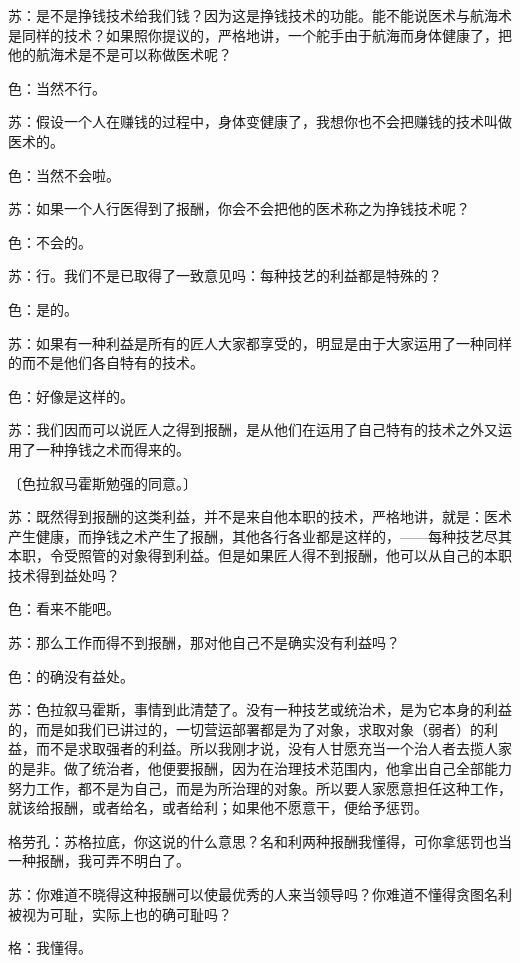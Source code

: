 \documentclass[11pt,oneside]{book}
\begin{document}
\begin{common-format}
苏：是不是挣钱技术给我们钱？因为这是挣钱技术的功能。能不能说医术与航海术是同样的技术？如果照你提议的，严格地讲，一个舵手由于航海而身体健康了，把他的航海术是不是可以称做医术呢？

色：当然不行。

苏：假设一个人在赚钱的过程中，身体变健康了，我想你也不会把赚钱的技术叫做医术的。

色：当然不会啦。

苏：如果一个人行医得到了报酬，你会不会把他的医术称之为挣钱技术呢？

色：不会的。

苏：行。我们不是已取得了一致意见吗：每种技艺的利益都是特殊的？

色：是的。

苏：如果有一种利益是所有的匠人大家都享受的，明显是由于大家运用了一种同样的而不是他们各自特有的技术。

色：好像是这样的。

苏：我们因而可以说匠人之得到报酬，是从他们在运用了自己特有的技术之外又运用了一种挣钱之术而得来的。

〔色拉叙马霍斯勉强的同意。〕

苏：既然得到报酬的这类利益，并不是来自他本职的技术，严格地讲，就是：医术产生健康，而挣钱之术产生了报酬，其他各行各业都是这样的，——每种技艺尽其本职，令受照管的对象得到利益。但是如果匠人得不到报酬，他可以从自己的本职技术得到益处吗？

色：看来不能吧。

苏：那么工作而得不到报酬，那对他自己不是确实没有利益吗？

色：的确没有益处。

苏：色拉叙马霍斯，事情到此清楚了。没有一种技艺或统治术，是为它本身的利益的，而是如我们已讲过的，一切营运部署都是为了对象，求取对象（弱者）的利益，而不是求取强者的利益。所以我刚才说，没有人甘愿充当一个治人者去揽人家的是非。做了统治者，他便要报酬，因为在治理技术范围内，他拿出自己全部能力努力工作，都不是为自己，而是为所治理的对象。所以要人家愿意担任这种工作，就该给报酬，或者给名，或者给利；如果他不愿意干，便给予惩罚。

格劳孔：苏格拉底，你这说的什么意思？名和利两种报酬我懂得，可你拿惩罚也当一种报酬，我可弄不明白了。

苏：你难道不晓得这种报酬可以使最优秀的人来当领导吗？你难道不懂得贪图名利被视为可耻，实际上也的确可耻吗？

格：我懂得。


\end{common-format}
\end{document}
